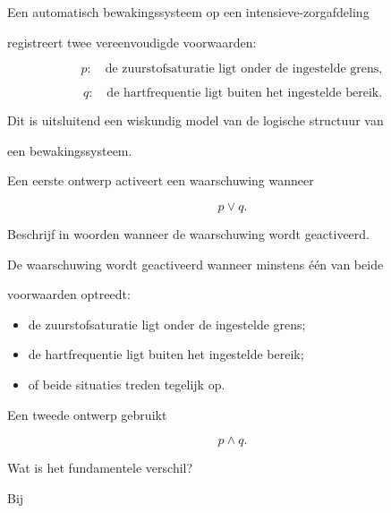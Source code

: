 \documentclass{ximera}
\begin{document}
\begin{oefening}{\oefG}

Een automatisch bewakingssysteem op een intensieve-zorgafdeling

registreert twee vereenvoudigde voorwaarden:

\[
p:\quad \text{de zuurstofsaturatie ligt onder de ingestelde grens},
\]

\[
q:\quad \text{de hartfrequentie ligt buiten het ingestelde bereik}.
\]

Dit is uitsluitend een wiskundig model van de logische structuur van

een bewakingssysteem.

Een eerste ontwerp activeert een waarschuwing wanneer

\[
p\lor q.
\]

\begin{question}

Beschrijf in woorden wanneer de waarschuwing wordt geactiveerd.

\begin{oplossing}

De waarschuwing wordt geactiveerd wanneer minstens één van beide

voorwaarden optreedt:

\begin{itemize}

  \item de zuurstofsaturatie ligt onder de ingestelde grens;

  \item de hartfrequentie ligt buiten het ingestelde bereik;

  \item of beide situaties treden tegelijk op.

\end{itemize}

\end{oplossing}

\end{question}



\begin{question}

Een tweede ontwerp gebruikt

\[
p\land q.
\]

Wat is het fundamentele verschil?

\begin{oplossing}

Bij


\end{oplossing}
\end{question}
\end{oefening}
\end{document}
